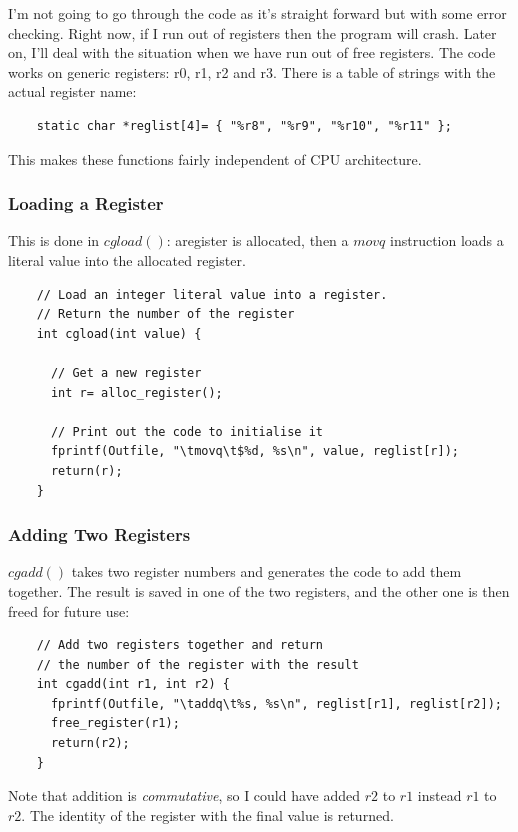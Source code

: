 \documentclass[journal, onecolumn, 12pt]{IEEEtran}
\begin{document}
I'm not going to go through the code as it's straight forward but with some error checking. Right now, if I run out of registers then the program will crash. Later on, I'll deal with the situation when we have run out of free registers. The code works on generic registers: r0, r1, r2 and r3. There is a table of strings with the actual register name:

\begin{lstlisting}
    static char *reglist[4]= { "%r8", "%r9", "%r10", "%r11" };
\end{lstlisting}

This makes these functions fairly independent of CPU architecture.

\subsubsection{Loading a Register}

This is done in $cgload()$: aregister is allocated, then a $movq$ instruction loads a literal value into the allocated register.

\begin{lstlisting}
    // Load an integer literal value into a register.
    // Return the number of the register
    int cgload(int value) {
    
      // Get a new register
      int r= alloc_register();
    
      // Print out the code to initialise it
      fprintf(Outfile, "\tmovq\t$%d, %s\n", value, reglist[r]);
      return(r);
    }
\end{lstlisting}

\subsubsection{Adding Two Registers}

$cgadd()$ takes two register numbers and generates the code to add them together. The result is saved in one of the two registers, and the other one is then freed for future use:

\begin{lstlisting}
    // Add two registers together and return
    // the number of the register with the result
    int cgadd(int r1, int r2) {
      fprintf(Outfile, "\taddq\t%s, %s\n", reglist[r1], reglist[r2]);
      free_register(r1);
      return(r2);
    }
\end{lstlisting}

Note that addition is \textit{commutative}, so I could have added $r2$ to $r1$ instead $r1$ to $r2$. The identity of the register with the final value is returned.
\end{document}

